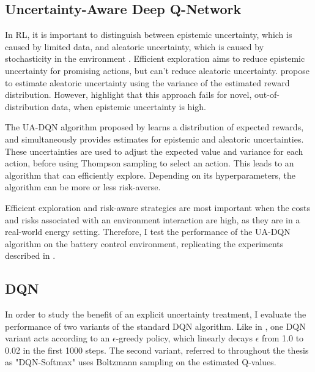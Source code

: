 \subsection{Uncertainty-Aware Deep Q-Network} %
In RL, it is important to distinguish between epistemic uncertainty, which is caused by limited data, and aleatoric uncertainty, which is caused by stochasticity in the environment \citep{hullermeier2021AleatoricEpistemicUncertainty}.
Efficient exploration aims to reduce epistemic uncertainty for promising actions, but can't reduce aleatoric uncertainty.
\cite{nikolov2022InformationDirectedExplorationDeep} propose to estimate aleatoric uncertainty using the variance of the estimated reward distribution.
However, \cite{chua2018DeepReinforcementLearning} highlight that this approach fails for novel, out-of-distribution data, when epistemic uncertainty is high.

The UA-DQN algorithm proposed by \cite{clements2020EstimatingRiskUncertainty} learns a distribution of expected rewards, and simultaneously provides estimates for epistemic and aleatoric uncertainties.
These uncertainties are used to adjust the expected value and variance for each action, before using Thompson sampling to select an action.
This leads to an algorithm that can efficiently explore.
Depending on its hyperparameters, the algorithm can be more or less risk-averse.

Efficient exploration and risk-aware strategies are most important when the costs and risks associated with an environment interaction are high, as they are in a real-world energy setting.
Therefore, I test the performance of the UA-DQN algorithm on the battery control environment, replicating the experiments described in \cite{clements2020EstimatingRiskUncertainty}.


\subsection{DQN}
In order to study the benefit of an explicit uncertainty treatment, I evaluate the performance of two variants of the standard DQN algorithm.
Like in \cite{clements2020EstimatingRiskUncertainty}, one DQN variant acts according to an $\epsilon$-greedy policy, which linearly decays $\epsilon$ from 1.0 to 0.02 in the first 1000 steps.
The second variant, referred to throughout the thesis as "DQN-Softmax" uses Boltzmann sampling on the estimated Q-values.

